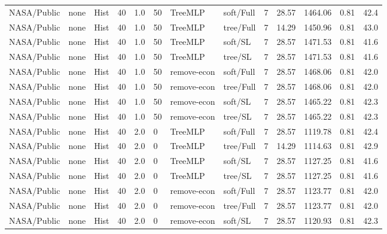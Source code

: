 \documentclass[10pt,a4paper]{article}
\begin{document}
\begin{landscape}
\begin{longtable}{llllllllrrrrr}
NASA/Public & none & Hist & 40 & 1.0 & 50 & TreeMLP & soft/Full & 7 & 28.57 & 1464.06 & 0.81 & 42.4 \\

NASA/Public & none & Hist & 40 & 1.0 & 50 & TreeMLP & tree/Full & 7 & 14.29 & 1450.96 & 0.81 & 43.0 \\

NASA/Public & none & Hist & 40 & 1.0 & 50 & TreeMLP & soft/SL & 7 & 28.57 & 1471.53 & 0.81 & 41.6 \\

NASA/Public & none & Hist & 40 & 1.0 & 50 & TreeMLP & tree/SL & 7 & 28.57 & 1471.53 & 0.81 & 41.6 \\

NASA/Public & none & Hist & 40 & 1.0 & 50 & remove-econ & soft/Full & 7 & 28.57 & 1468.06 & 0.81 & 42.0 \\

NASA/Public & none & Hist & 40 & 1.0 & 50 & remove-econ & tree/Full & 7 & 28.57 & 1468.06 & 0.81 & 42.0 \\

NASA/Public & none & Hist & 40 & 1.0 & 50 & remove-econ & soft/SL & 7 & 28.57 & 1465.22 & 0.81 & 42.3 \\

NASA/Public & none & Hist & 40 & 1.0 & 50 & remove-econ & tree/SL & 7 & 28.57 & 1465.22 & 0.81 & 42.3 \\

NASA/Public & none & Hist & 40 & 2.0 & 0 & TreeMLP & soft/Full & 7 & 28.57 & 1119.78 & 0.81 & 42.4 \\

NASA/Public & none & Hist & 40 & 2.0 & 0 & TreeMLP & tree/Full & 7 & 14.29 & 1114.63 & 0.81 & 42.9 \\

NASA/Public & none & Hist & 40 & 2.0 & 0 & TreeMLP & soft/SL & 7 & 28.57 & 1127.25 & 0.81 & 41.6 \\

NASA/Public & none & Hist & 40 & 2.0 & 0 & TreeMLP & tree/SL & 7 & 28.57 & 1127.25 & 0.81 & 41.6 \\

NASA/Public & none & Hist & 40 & 2.0 & 0 & remove-econ & soft/Full & 7 & 28.57 & 1123.77 & 0.81 & 42.0 \\

NASA/Public & none & Hist & 40 & 2.0 & 0 & remove-econ & tree/Full & 7 & 28.57 & 1123.77 & 0.81 & 42.0 \\

NASA/Public & none & Hist & 40 & 2.0 & 0 & remove-econ & soft/SL & 7 & 28.57 & 1120.93 & 0.81 & 42.3 \\


\end{longtable}
\end{landscape}
\end{document}

